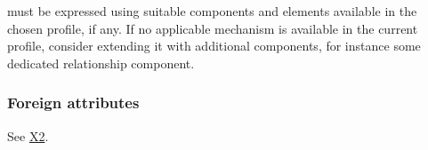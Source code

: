 must be expressed using suitable components and elements available in the chosen profile, if any. If no applicable mechanism is available in the current profile, consider extending it with additional components, for instance some dedicated relationship component.

\begin{workinprogress}
\subsubsection{Foreign attributes}\label{foreign-attributes}


 

See \hyperref[x2]{X2}.

\end{workinprogress}